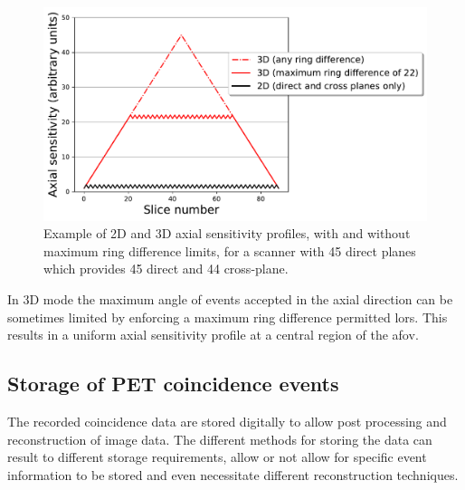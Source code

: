 \begin{figure} [h!]
\centering
\includegraphics[scale=0.50,angle=0]{2_Theory_Methods/figures/2_2_2D3DSensitivityProfiles.pdf}
\caption{Example of 2D and 3D axial sensitivity profiles, with and without maximum ring difference limits, for a scanner with 45 direct planes which provides 45 direct and 44 cross-plane.} 
\label{fig_2:2D3DSensitivityProfiles}
\end{figure} 
%
%
In 3D mode the maximum angle of events accepted in the axial direction can be sometimes limited by enforcing a maximum ring difference permitted \glspl{lor}. This results in a uniform axial sensitivity profile at a central region of the \gls{afov}.
%
%
\subsection{Storage of PET coincidence events}
The recorded coincidence data are stored digitally to allow post processing and reconstruction of image data.
The different methods for storing the data can result to different storage requirements, allow or not allow for specific event information to be stored and even necessitate different reconstruction techniques. 

